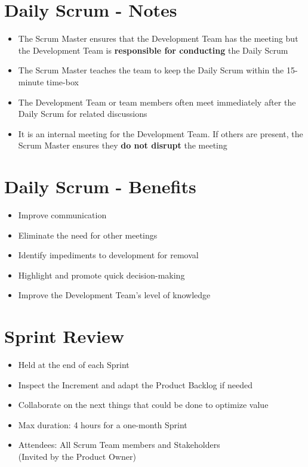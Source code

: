 \documentclass[a4paper,11pt,twocolumn]{article}
\begin{document}
\section*{Daily Scrum - Notes}
\begin{itemize}
	\item The Scrum Master ensures that the Development Team has the meeting but the Development Team is \textbf{responsible for conducting} the Daily Scrum
	\item The Scrum Master teaches the team to keep the Daily Scrum within the 15-minute time-box
	\item The Development Team or team members often meet immediately after the Daily Scrum for related discussions
    \item It is an internal meeting for the Development Team. If others are present, the Scrum Master ensures they \textbf{do not disrupt} the meeting
\end{itemize}

\section*{Daily Scrum - Benefits}
\begin{itemize}
	\item Improve communication
	\item Eliminate the need for other meetings
	\item Identify impediments to development for removal
	\item Highlight and promote quick decision-making
	\item Improve the Development Team's level of knowledge
\end{itemize}

\section*{Sprint Review}
\begin{itemize}
	\item Held at the end of each Sprint
	\item Inspect the Increment and adapt the Product Backlog if needed
	\item Collaborate on the next things that could be done to optimize value
	\item Max duration: 4 hours for a one-month Sprint
	\item Attendees: All Scrum Team members and Stakeholders\\
	(Invited by the Product Owner)
\end{itemize}
\end{document}
